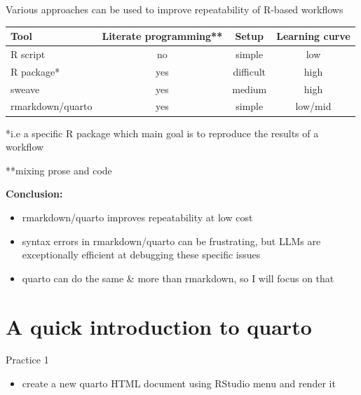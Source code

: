 \documentclass[
  ignorenonframetext,
  aspectratio=169,
  t]{beamer}
\providecommand{\tightlist}{%
  \setlength{\itemsep}{0pt}\setlength{\parskip}{0pt}}
\begin{document}
\begin{frame}{Various approaches can be used to improve repeatability of
R-based workflows}
\protect{}\label{various-approaches-can-be-used-to-improve-repeatability-of-r-based-workflows}
\footnotesize

\begingroup\fontsize{10}{12}\selectfont

\begin{longtable*}[t]{lccc}
\toprule
Tool & Literate programming** & Setup & Learning curve\\
\midrule
R script & no & simple & low\\
R package* & yes & difficult & high\\
sweave & yes & medium & high\\
rmarkdown/quarto & yes & simple & low/mid\\
\bottomrule
\end{longtable*}
\endgroup{}

\normalsize

*i.e a specific R package which main goal is to reproduce the results of
a workflow

**mixing prose and code

\pause

\textbf{Conclusion:}

\begin{itemize}
\tightlist
\item
  rmarkdown/quarto improves repeatability at low cost
\item
  syntax errors in rmarkdown/quarto can be frustrating, but LLMs are
  exceptionally efficient at debugging these specific issues
\item
  quarto can do the same \& more than rmarkdown, so I will focus on that
\end{itemize}
\end{frame}

\section{A quick introduction to
quarto}\label{a-quick-introduction-to-quarto}

\begin{frame}{Practice 1}
\protect{}\label{practice-1}
\begin{itemize}
\tightlist
\item
  create a new quarto HTML document using RStudio menu and render it
\end{itemize}
\end{frame}
\end{document}
